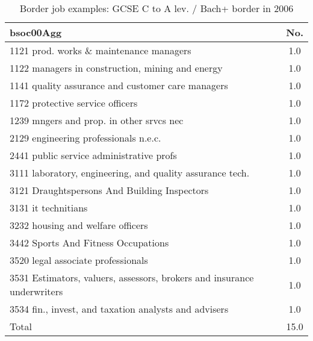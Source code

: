 \begin{table}[h!]
	\centering
	\caption{Border job examples: GCSE C to A lev. / Bach+ border in 2006}
		\label{tab:357223}
	\begin{tabular}{lc}
	\toprule
bsoc00Agg&No. \\
\hline
1121 prod. works \& maintenance managers&1.0 \\
1122 managers in construction, mining and energy&1.0 \\
1141 quality assurance and customer care managers&1.0 \\
1172 protective service officers&1.0 \\
1239 mngers and prop. in other srvcs nec&1.0 \\
2129 engineering professionals n.e.c.&1.0 \\
2441 public service administrative profs&1.0 \\
3111 laboratory, engineering, and quality assurance tech.&1.0 \\
3121 Draughtspersons And Building Inspectors&1.0 \\
3131 it technitians&1.0 \\
3232 housing and welfare officers&1.0 \\
3442 Sports And Fitness Occupations&1.0 \\
3520 legal associate professionals&1.0 \\
3531 Estimators, valuers, assessors, brokers and insurance underwriters&1.0 \\
3534 fin., invest, and taxation analysts and advisers&1.0 \\
Total&15.0 \\
\bottomrule
\bottomrule
\end{tabular}
\end{table}
